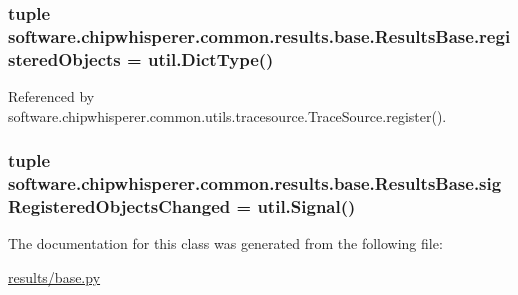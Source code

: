 \subsubsection[{registered\+Objects}]{\setlength{\rightskip}{0pt plus 5cm}tuple software.\+chipwhisperer.\+common.\+results.\+base.\+Results\+Base.\+registered\+Objects = util.\+Dict\+Type()\hspace{0.3cm}{\ttfamily [static]}}\label{classsoftware_1_1chipwhisperer_1_1common_1_1results_1_1base_1_1ResultsBase_ac0d733a6098da1cedab98f46a587beb6}


Referenced by software.\+chipwhisperer.\+common.\+utils.\+tracesource.\+Trace\+Source.\+register().

\hypertarget{classsoftware_1_1chipwhisperer_1_1common_1_1results_1_1base_1_1ResultsBase_a49a8dbf8a5790e3153def3b292510715}{}
\subsubsection[{sig\+Registered\+Objects\+Changed}]{\setlength{\rightskip}{0pt plus 5cm}tuple software.\+chipwhisperer.\+common.\+results.\+base.\+Results\+Base.\+sig\+Registered\+Objects\+Changed = util.\+Signal()\hspace{0.3cm}{\ttfamily [static]}}\label{classsoftware_1_1chipwhisperer_1_1common_1_1results_1_1base_1_1ResultsBase_a49a8dbf8a5790e3153def3b292510715}


The documentation for this class was generated from the following file\+:\begin{DoxyCompactItemize}
\item 
\hyperlink{results_2base_8py}{results/base.\+py}\end{DoxyCompactItemize}
